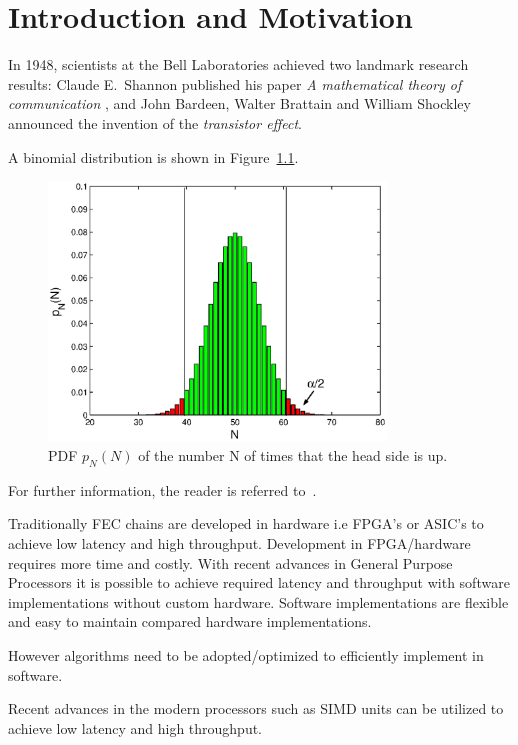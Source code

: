 \chapter{Introduction and Motivation} \label{chap:introduction}



In 1948, scientists at the Bell Laboratories achieved two landmark research results:
Claude E.~Shannon published his paper \emph{A mathematical theory of communication} \cite{Shannon}, and John Bardeen, Walter Brattain and William Shockley announced the invention of the \emph{transistor effect}.

\cite{Arikan}

A binomial distribution is shown in Figure~\ref{fig:coin_bino}.

\begin{figure}[!htb]
    \centering
    \includegraphics[width=0.8\textwidth]{./figures/coin_bino.eps}
    \caption{PDF $p_N(N)$ of the number N of times that the head side is up.}
    \label{fig:coin_bino}
\end{figure}

For further information, the reader is referred to~\cite{Cover, Clayton, Sachs92, Paninski03, Berrou, Chechik03, Onkamo, SourceCoding, DeltaFunction}.\newline

Traditionally FEC chains are developed in hardware i.e FPGA’s or ASIC’s to achieve low latency and high throughput.
Development in FPGA/hardware requires more time and costly.
With recent advances in General Purpose Processors it is possible to achieve required latency and throughput with software implementations without custom hardware.
Software implementations are flexible and easy to maintain compared hardware implementations.

However algorithms need to be adopted/optimized to efficiently implement in software.

Recent advances in the modern processors such as SIMD units can be utilized to achieve low latency and high throughput.



\clearpage
